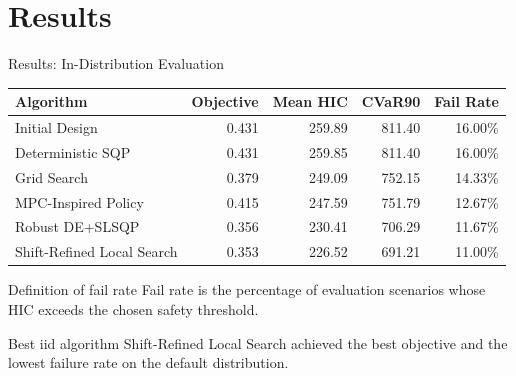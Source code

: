\documentclass[aspectratio=169]{beamer}
\begin{document}
\section{Results}

\begin{frame}{Results: In-Distribution Evaluation}
  \begin{table}
    \centering
    \scriptsize
    \begin{tabular}{lrrrr}
      \toprule
      Algorithm & Objective & Mean HIC & CVaR90 & Fail Rate \\
      \midrule
      Initial Design & 0.431 & 259.89 & 811.40 & 16.00\% \\
      Deterministic SQP & 0.431 & 259.85 & 811.40 & 16.00\% \\
      Grid Search & 0.379 & 249.09 & 752.15 & 14.33\% \\
      MPC-Inspired Policy & 0.415 & 247.59 & 751.79 & 12.67\% \\
      Robust DE+SLSQP & 0.356 & 230.41 & 706.29 & 11.67\% \\
      Shift-Refined Local Search & 0.353 & 226.52 & 691.21 & 11.00\% \\
      \bottomrule
    \end{tabular}
  \end{table}

  \vspace{0.3em}
  \begin{block}{Definition of fail rate}
    Fail rate is the percentage of evaluation scenarios whose HIC exceeds the chosen safety threshold.
  \end{block}

  \vspace{0.3em}
  \begin{block}{Best iid algorithm}
    Shift-Refined Local Search achieved the best objective and the lowest failure rate on the default distribution.
  \end{block}
\end{frame}
\end{document}
